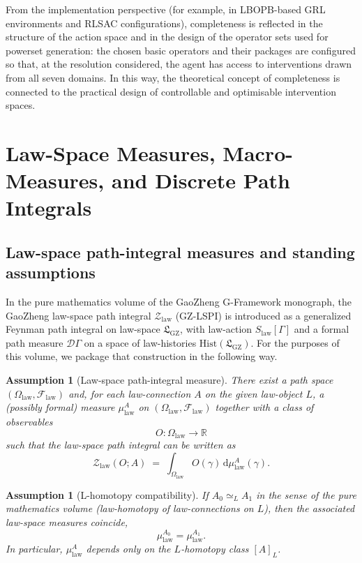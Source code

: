 \documentclass[11pt]{book}
\theoremstyle{plain}
\newtheorem{assumption}[theorem]{Assumption}
\theoremstyle{definition}
\theoremstyle{remark}
\newcommand{\GZLS}{\ensuremath{\mathfrak{L}_{\mathrm{GZ}}}}       \newcommand{\GZLT}{\ensuremath{M_{!w}}}                           \newcommand{\GZLOC}{\ensuremath{A_M}}                             \newcommand{\GZLCurv}{\ensuremath{\mathcal{F}_{\mathrm{law}}}}
\newcommand{\R}{\mathbb{R}}
\begin{document}
From the implementation perspective (for example, in LBOPB-based GRL
environments and RLSAC configurations), completeness is reflected in
the structure of the action space and in the design of the operator
sets used for powerset generation: the chosen basic operators and their
packages are configured so that, at the resolution considered, the
agent has access to interventions drawn from all seven domains. In this
way, the theoretical concept of completeness is connected to the
practical design of controllable and optimisable intervention spaces.

\section[Law-Space Measures, Macro-Measures, and Discrete Path Integrals]{Law-Space Measures, Macro-Measures, and Discrete Path Integrals}
\label{sec:law-measure-macro-measure}



\subsection{Law-space path-integral measures and standing assumptions}

In the pure mathematics volume of the GaoZheng G-Framework monograph,
the GaoZheng law-space path integral $\mathcal{Z}_{\mathrm{law}}$
(GZ-LSPI) is introduced as a generalized Feynman path integral on
law-space $\GZLS$, with law-action $S_{\mathrm{law}}[\Gamma]$ and a
formal path measure $\mathcal{D}\Gamma$ on a space of law-histories
$\mathrm{Hist}(\GZLS)$.
For the purposes of this volume, we package that construction in the
following way.

\begin{assumption}[Law-space path-integral measure]\label{ass:law-measure}
There exist a path space $(\Omega_{\mathrm{law}},\mathcal{F}_{\mathrm{law}})$
and, for each law-connection $A$ on the given law-object $L$, a (possibly
formal) measure $\mu_{\mathrm{law}}^A$ on
$(\Omega_{\mathrm{law}},\mathcal{F}_{\mathrm{law}})$ together with a
class of observables
\[
  O : \Omega_{\mathrm{law}}\longrightarrow\R
\]
such that the law-space path integral can be written as
\[
  \mathcal{Z}_{\mathrm{law}}(O;A)
  \;=\;
  \int_{\Omega_{\mathrm{law}}} O(\gamma)\,\mathrm{d}\mu_{\mathrm{law}}^A(\gamma).
\]
\end{assumption}

\begin{assumption}[L-homotopy compatibility]\label{ass:L-homotopy}
If $A_0\simeq_L A_1$ in the sense of the pure mathematics volume
(law-homotopy of law-connections on $L$), then the associated
law-space measures coincide,
\[
  \mu_{\mathrm{law}}^{A_0} = \mu_{\mathrm{law}}^{A_1}.
\]
In particular, $\mu_{\mathrm{law}}^A$ depends only on the
$L$-homotopy class $[A]_L$.
\end{assumption}
\end{document}
